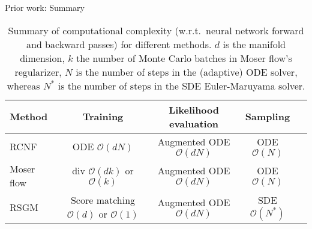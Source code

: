    
   \begin{frame}{Prior work: Summary}
   
   \begin{table}[t]
   \centering
   \small
   \setlength{\tabcolsep}{0.5em}
   \renewcommand*{\arraystretch}{1.4}
   \begin{tabular}{l|cccc}
   \toprule
   Method & Training & Likelihood evaluation & Sampling \\
   \midrule
   RCNF & ODE $\mathcal{O}(dN)$ & Augmented ODE $\mathcal{O}(dN)$ & ODE $\mathcal{O}(N)$ \\ %
   Moser flow & $\text{div}$ $\mathcal{O}(dk)$ or $\mathcal{O}(k)$ & Augmented ODE $\mathcal{O}(dN)$ & ODE $\mathcal{O}(N)$ \\ %
   RSGM & Score matching $\mathcal{O}(d)$ or $\mathcal{O}(1)$ & Augmented ODE $\mathcal{O}(dN)$ & SDE $\mathcal{O}(N^*)$ \\ \bottomrule
   \end{tabular} 
   
   \caption{ \small Summary of computational complexity (w.r.t.\ neural network
     forward and backward passes) for different methods. 
     $d$ is the manifold
     dimension, $k$ the number of Monte Carlo batches in Moser flow's regularizer,
     $N$ is the number of steps in the (adaptive) ODE solver, whereas $N^*$ is the
     number of steps in the SDE Euler-Maruyama solver.%
   }
   \label{tab:comparison_methods}
   \end{table}
   
   
   \end{frame}
   
